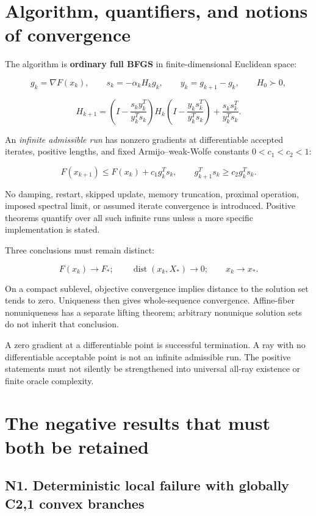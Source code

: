 \section{Algorithm, quantifiers, and notions of convergence}\label{algorithm-quantifiers-and-notions-of-convergence}

The algorithm is \textbf{ordinary full BFGS} in finite-dimensional Euclidean space:

\[
 g_k=\nabla F(x_k),\qquad s_k=-\alpha_kH_kg_k,\qquad
 y_k=g_{k+1}-g_k,\qquad H_0\succ0,
\]

\[
 H_{k+1}=\left(I-\frac{s_ky_k^T}{y_k^Ts_k}\right)H_k
 \left(I-\frac{y_ks_k^T}{y_k^Ts_k}\right)
 +\frac{s_ks_k^T}{y_k^Ts_k}.
\]

An \emph{infinite admissible run} has nonzero gradients at differentiable accepted iterates, positive lengths, and fixed Armijo--weak-Wolfe constants \(0<c_1<c_2<1\):

\[
 F(x_{k+1})\le F(x_k)+c_1g_k^Ts_k,\qquad
 g_{k+1}^Ts_k\ge c_2g_k^Ts_k.
\]

No damping, restart, skipped update, memory truncation, proximal operation, imposed spectral limit, or assumed iterate convergence is introduced. Positive theorems quantify over all such infinite runs unless a more specific implementation is stated.

Three conclusions must remain distinct:

\[
 F(x_k)\to F_*;\qquad \operatorname{dist}(x_k,X_*)\to0;\qquad x_k\to x_*.
\]

On a compact sublevel, objective convergence implies distance to the solution set tends to zero. Uniqueness then gives whole-sequence convergence. Affine-fiber nonuniqueness has a separate lifting theorem; arbitrary nonunique solution sets do not inherit that conclusion.

A zero gradient at a differentiable point is successful termination. A ray with no differentiable acceptable point is not an infinite admissible run. The positive statements must not silently be strengthened into universal all-ray existence or finite oracle complexity.

\section{The negative results that must both be retained}\label{the-negative-results-that-must-both-be-retained}

\subsection{N1. Deterministic local failure with globally C2,1 convex branches}\label{n1.-deterministic-local-failure-with-globally-c21-convex-branches}

